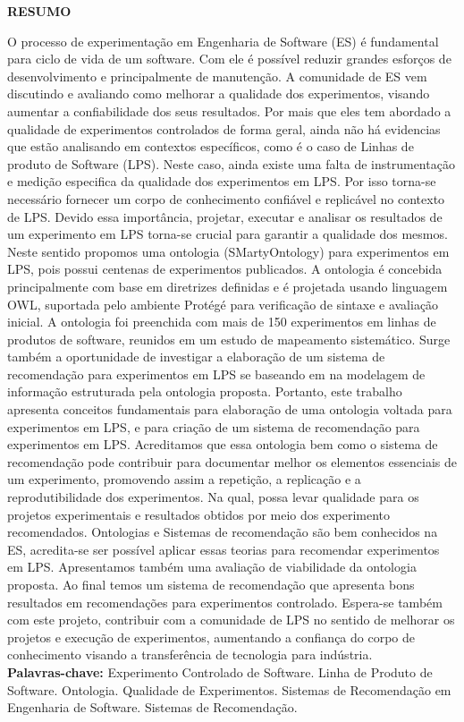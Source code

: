 \clearpage
\thispagestyle{empty}

\noindent{\large\bf\dadoTitulo}
\noindent{\large\dadoSubTitulo}

\normalsize
\begin{center}	
	\vspace*{0.5cm}
	\textbf{RESUMO}
\end{center}

O processo de experimentação em Engenharia de Software (ES) é fundamental para ciclo de vida de um software. Com ele é possível reduzir grandes esforços de desenvolvimento e principalmente de manutenção. A comunidade de ES vem discutindo e avaliando como melhorar a qualidade dos experimentos, visando aumentar a confiabilidade dos seus resultados. Por mais que eles tem abordado a qualidade de experimentos controlados de forma geral, ainda não há evidencias que estão analisando em contextos específicos, como é o caso de Linhas de produto de Software (LPS). Neste caso, ainda existe uma falta de instrumentação e medição especifica da qualidade dos experimentos em LPS. Por isso torna-se necessário fornecer um corpo de conhecimento confiável e replicável no contexto de LPS. Devido essa importância, projetar, executar e analisar os resultados de um experimento em LPS torna-se crucial para garantir a qualidade dos mesmos. Neste sentido propomos uma ontologia (SMartyOntology) para experimentos em LPS, pois possui centenas de experimentos publicados. A ontologia é concebida principalmente com base em diretrizes definidas e é projetada usando linguagem OWL, suportada pelo ambiente Protégé para verificação de sintaxe e avaliação inicial. A ontologia foi preenchida com mais de 150 experimentos em linhas de produtos de software, reunidos em um estudo de mapeamento sistemático. Surge também a oportunidade de investigar a elaboração de um sistema de recomendação para experimentos em LPS se baseando em na modelagem de informação estruturada pela ontologia proposta. Portanto, este trabalho apresenta conceitos fundamentais para elaboração de uma ontologia voltada para experimentos em LPS, e para criação de um sistema de recomendação para experimentos em LPS. Acreditamos que essa ontologia  bem como o sistema de recomendação pode contribuir para documentar melhor os elementos essenciais de um experimento, promovendo assim a repetição, a replicação e a reprodutibilidade dos experimentos. Na qual, possa levar qualidade para os projetos experimentais e resultados obtidos por meio dos experimento recomendados. Ontologias e Sistemas de recomendação são bem conhecidos na ES, acredita-se ser possível aplicar essas teorias para recomendar experimentos em LPS. Apresentamos também uma avaliação de viabilidade da ontologia proposta. Ao final temos um sistema de recomendação que apresenta bons resultados em recomendações para experimentos controlado. Espera-se também com este projeto, contribuir com a comunidade de LPS no sentido de melhorar os projetos e execução de experimentos, aumentando a confiança do corpo de conhecimento visando a transferência de tecnologia para indústria.\\

\noindent \textbf{Palavras-chave:} Experimento Controlado de Software. Linha de Produto de Software. Ontologia. Qualidade de Experimentos. Sistemas de Recomendação em Engenharia de Software. Sistemas de Recomendação.

\pagebreak
